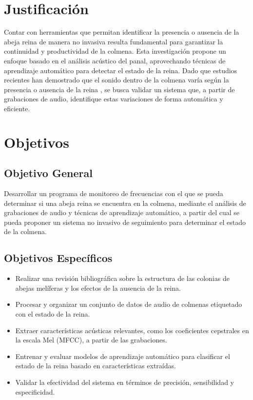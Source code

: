 \documentclass[12pt]{report}
\begin{document}
\section{Justificación}

Contar con herramientas que permitan identificar la presencia o ausencia de la abeja reina de manera no invasiva resulta fundamental para garantizar la continuidad y productividad de la colmena. Esta investigación propone un enfoque basado en el análisis acústico del panal, aprovechando técnicas de aprendizaje automático para detectar el estado de la reina. Dado que estudios recientes han demostrado que el sonido dentro de la colmena varía según la presencia o ausencia de la reina \cite{ruvinga2021use, maarefremote, hunter2013signal, ruvinga2023identifying}, se busca validar un sistema que, a partir de grabaciones de audio, identifique estas variaciones de forma automática y eficiente.


\section{Objetivos}

\subsection{Objetivo General}

Desarrollar un programa de monitoreo de frecuencias con el que se pueda determinar si una abeja reina se encuentra en la colmena, mediante el análisis de grabaciones de audio y técnicas de aprendizaje automático, a partir del cual se pueda proponer un sistema no invasivo de seguimiento para determinar el estado de la colmena.

\subsection{Objetivos Específicos}

\begin{itemize}
    \item[\ding{43}] Realizar una revisión bibliográfica sobre la estructura de las colonias de abejas melíferas y los efectos de la ausencia de la reina.
    \item[\ding{43}] Procesar y organizar un conjunto de datos de audio de colmenas etiquetado con el estado de la reina.
    \item[\ding{43}] Extraer características acústicas relevantes, como los coeficientes cepstrales en la escala Mel (MFCC), a partir de las grabaciones.
    \item[\ding{43}] Entrenar y evaluar modelos de aprendizaje automático para clasificar el estado de la reina basado en características extraídas.
    \item[\ding{43}] Validar la efectividad del sistema en términos de precisión, sensibilidad y especificidad.
\end{itemize}
\end{document}
